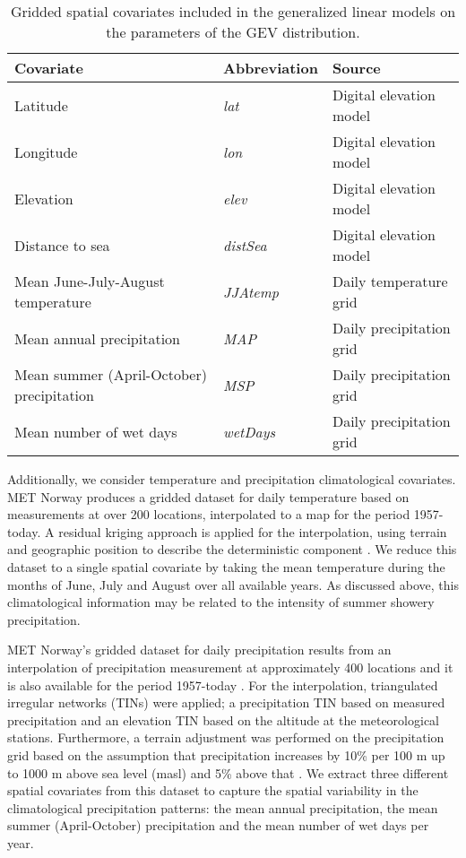 \documentclass[11pt,english]{article}
\begin{document}
\begin{table}[!hbtp]
  \caption{Gridded spatial covariates included in the generalized linear models on the parameters of the GEV distribution.}\label{tab:cov}
  \centering
  \vspace{2mm}
  \begin{tabular}{lll}
    \toprule
    \textbf{Covariate} & \textbf{Abbreviation} & \textbf{Source}\\
    \midrule
    Latitude & \textsl{lat} & Digital elevation model \\
    Longitude & \textsl{lon} & Digital elevation model\\
    Elevation & \textsl{elev} & Digital elevation model\\
    Distance to sea & \textsl{distSea} & Digital elevation model\\
    Mean June-July-August temperature & \textsl{JJAtemp} & Daily temperature grid\\
    Mean annual precipitation & \textsl{MAP} & Daily precipitation grid\\
    Mean summer (April-October) precipitation & \textsl{MSP} & Daily precipitation grid\\
    Mean number of wet days & \textsl{wetDays} & Daily precipitation grid\\
    \bottomrule
  \end{tabular}
\end{table}

Additionally, we consider temperature and precipitation climatological covariates.  MET Norway produces a gridded dataset for daily temperature based on measurements at over 200 locations, interpolated to a map for the period 1957-today.  A residual kriging approach is applied for the interpolation, using terrain and geographic position to describe the deterministic component \citep{Tveitoetal2002, Mohr2009, Janssonetal2007}. We reduce this dataset to a single spatial covariate by taking the mean temperature during the months of June, July and August over all available years.  As discussed above, this climatological information may be related to the intensity of summer showery precipitation. 

MET Norway's gridded dataset for daily precipitation results from an interpolation of precipitation measurement at approximately 400 locations and it is also available for the period 1957-today \citep{Tveitoetal2002, Mohr2009, Janssonetal2007}. For the interpolation, triangulated irregular networks (TINs) were applied; a precipitation TIN based on measured precipitation and an elevation TIN based on the altitude at the meteorological stations.  Furthermore, a terrain adjustment was performed on the precipitation grid based on the assumption that precipitation increases by 10\% per 100 m up to 1000 m above sea level (masl) and 5\% above that \citep{Forland1979,Forland1984b}.  We extract three different spatial covariates from this dataset to capture the spatial variability in the climatological precipitation patterns: the mean annual precipitation, the mean summer (April-October) precipitation and the mean number of wet days per year.
\end{document}
